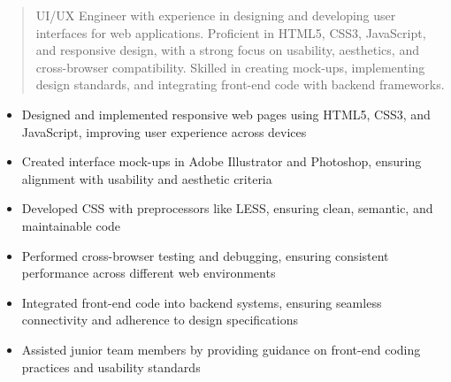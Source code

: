 



\makecvheader

\begin{quote}
  \noindent
  UI/UX Engineer with experience in designing and developing user interfaces for web applications. Proficient in HTML5, CSS3, JavaScript, and responsive design, with a strong focus on usability, aesthetics, and cross-browser compatibility. Skilled in creating mock-ups, implementing design standards, and integrating front-end code with backend frameworks.
\end{quote}

\par\smallskip
\noindent
\begin{minipage}{20cm}
  \begin{minipage}{9.75cm}
    \begin{itemize}
      \item Designed and implemented responsive web pages using HTML5, CSS3, and JavaScript, improving user experience across devices
      \item Created interface mock-ups in Adobe Illustrator and Photoshop, ensuring alignment with usability and aesthetic criteria
      \item Developed CSS with preprocessors like LESS, ensuring clean, semantic, and maintainable code
    \end{itemize}
  \end{minipage}
  \hfill
  \begin{minipage}{9.75cm}
    \begin{itemize}
      \item Performed cross-browser testing and debugging, ensuring consistent performance across different web environments
      \item Integrated front-end code into backend systems, ensuring seamless connectivity and adherence to design specifications
      \item Assisted junior team members by providing guidance on front-end coding practices and usability standards
    \end{itemize}
  \end{minipage}
\end{minipage}
\par\smallskip
\divider

